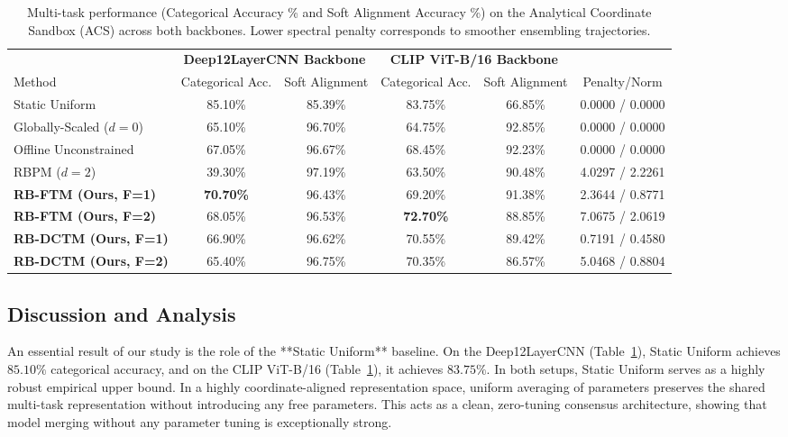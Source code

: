 \begin{table}[t]
\caption{Multi-task performance (Categorical Accuracy \% and Soft Alignment Accuracy \%) on the Analytical Coordinate Sandbox (ACS) across both backbones. Lower spectral penalty corresponds to smoother ensembling trajectories.}
\label{tab:main_results}
\vskip 0.15in
\begin{center}
\begin{small}
\begin{sc}
\setlength{\tabcolsep}{5pt}
\begin{tabular}{lccccc}
\toprule
 & \multicolumn{2}{c}{\textbf{Deep12LayerCNN Backbone}} & \multicolumn{2}{c}{\textbf{CLIP ViT-B/16 Backbone}} \\
Method & Categorical Acc. & Soft Alignment & Categorical Acc. & Soft Alignment & Penalty/Norm \\
\midrule
Static Uniform & 85.10\% & 85.39\% & 83.75\% & 66.85\% & 0.0000 / 0.0000 \\
\midrule
Globally-Scaled ($d=0$) & 65.10\% & 96.70\% & 64.75\% & 92.85\% & 0.0000 / 0.0000 \\
Offline Unconstrained & 67.05\% & 96.67\% & 68.45\% & 92.23\% & 0.0000 / 0.0000 \\
RBPM ($d=2$) & 39.30\% & 97.19\% & 63.50\% & 90.48\% & 4.0297 / 2.2261 \\
\midrule
\textbf{RB-FTM (Ours, F=1)} & \textbf{70.70\%} & 96.43\% & 69.20\% & 91.38\% & 2.3644 / 0.8771 \\
\textbf{RB-FTM (Ours, F=2)} & 68.05\% & 96.53\% & \textbf{72.70\%} & 88.85\% & 7.0675 / 2.0619 \\
\textbf{RB-DCTM (Ours, F=1)} & 66.90\% & 96.62\% & 70.55\% & 89.42\% & 0.7191 / 0.4580 \\
\textbf{RB-DCTM (Ours, F=2)} & 65.40\% & 96.75\% & 70.35\% & 86.57\% & 5.0468 / 0.8804 \\
\bottomrule
\end{tabular}
\end{sc}
\end{small}
\end{center}
\vskip -0.1in
\end{table}



\subsection{Discussion and Analysis}

An essential result of our study is the role of the **Static Uniform** baseline. On the Deep12LayerCNN (Table~\ref{tab:main_results}), Static Uniform achieves $85.10\%$ categorical accuracy, and on the CLIP ViT-B/16 (Table~\ref{tab:main_results}), it achieves $83.75\%$. In both setups, Static Uniform serves as a highly robust empirical upper bound. In a highly coordinate-aligned representation space, uniform averaging of parameters preserves the shared multi-task representation without introducing any free parameters. This acts as a clean, zero-tuning consensus architecture, showing that model merging without any parameter tuning is exceptionally strong.

